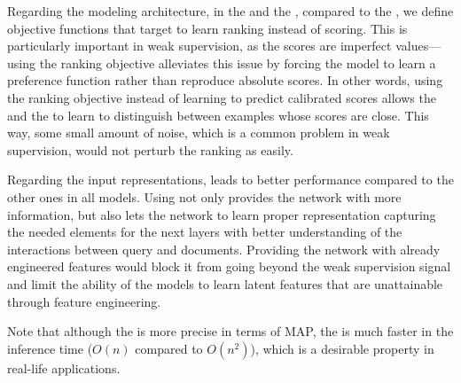 Regarding the modeling architecture, in the \modeltwo and the \modelthree, compared to the \modelone, we define objective functions that target to learn ranking instead of scoring. This is particularly important in weak supervision, as the scores are imperfect values\:---\:using the ranking objective alleviates this issue by forcing the model to learn a preference function rather than reproduce absolute scores.
%
In other words, using the ranking objective instead of learning to predict calibrated scores allows the \modeltwo and the \modelthree to learn to distinguish between examples whose scores are close. This way, some small amount of noise, which is a common problem in weak supervision, would not perturb the ranking as easily.

Regarding the input representations, \feedthree leads to better performance compared to the other ones in all models.
Using \feedthree not only provides the network with more information, but also lets the network to learn proper representation capturing the needed elements for the next layers with better understanding of the interactions between query and documents. 
Providing the network with already engineered features would block it from going beyond the weak supervision signal and limit the ability of the models to learn latent features that are unattainable through feature engineering. 

Note that although the \modelthree is more precise in terms of MAP, the \modeltwo is much faster in the inference time ($O(n)$ compared to $O(n^2)$), which is a desirable property in real-life applications.


